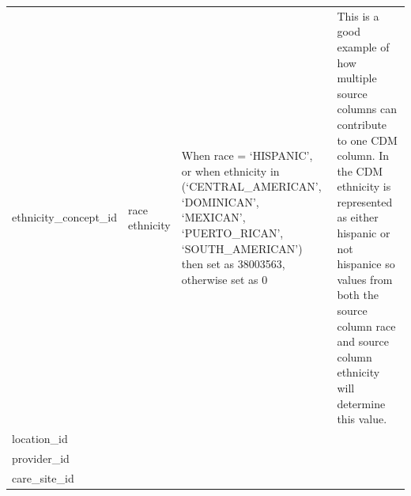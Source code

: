 \documentclass[11pt]{book}
\theoremstyle{definition}
\theoremstyle{definition}
\theoremstyle{definition}
\theoremstyle{remark}
\begin{document}
\begin{longtable}[]{@{}llll@{}}
\begin{minipage}[t]{0.24\columnwidth}
ethnicity\_concept\_id\strut
\end{minipage} & \begin{minipage}[t]{0.10\columnwidth}\raggedright
race ethnicity\strut
\end{minipage} & \begin{minipage}[t]{0.12\columnwidth}\raggedright
When race = `HISPANIC', or when ethnicity in (`CENTRAL\_AMERICAN', `DOMINICAN', `MEXICAN', `PUERTO\_RICAN', `SOUTH\_AMERICAN') then set as 38003563, otherwise set as 0\strut
\end{minipage} & \begin{minipage}[t]{0.42\columnwidth}\raggedright
This is a good example of how multiple source columns can contribute to one CDM column. In the CDM ethnicity is represented as either hispanic or not hispanice so values from both the source column race and source column ethnicity will determine this value.\strut
\end{minipage}\tabularnewline
\begin{minipage}[t]{0.24\columnwidth}\raggedright
location\_id\strut
\end{minipage} & \begin{minipage}[t]{0.10\columnwidth}\raggedright
\strut
\end{minipage} & \begin{minipage}[t]{0.12\columnwidth}\raggedright
\strut
\end{minipage} & \begin{minipage}[t]{0.42\columnwidth}\raggedright
\strut
\end{minipage}\tabularnewline
\begin{minipage}[t]{0.24\columnwidth}\raggedright
provider\_id\strut
\end{minipage} & \begin{minipage}[t]{0.10\columnwidth}\raggedright
\strut
\end{minipage} & \begin{minipage}[t]{0.12\columnwidth}\raggedright
\strut
\end{minipage} & \begin{minipage}[t]{0.42\columnwidth}\raggedright
\strut
\end{minipage}\tabularnewline
\begin{minipage}[t]{0.24\columnwidth}\raggedright
care\_site\_id\strut
\end{minipage} & \begin{minipage}[t]{0.10\columnwidth}\raggedright
\strut
\end{minipage} & \begin{minipage}[t]{0.12\columnwidth}\raggedright

\end{minipage}
\end{longtable}
\end{document}
